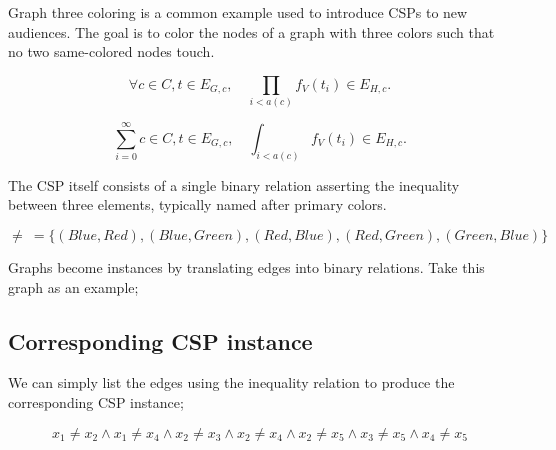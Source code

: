 Graph three coloring is a common example used to introduce CSPs to new
audiences. The goal is to color the nodes of a graph with three colors such that
no two same-colored nodes touch. 

\begin{equation}
    \forall c \in C, t \in E_{G, c}, \quad \prod_{i<a(c)} f_V(t_i) \in E_{H, c}.    
\end{equation}


\begin{equation}
    \sum_{i=0}^\infty c \in C, t \in E_{G, c}, \quad \int_{i<a(c)} f_V(t_i) \in E_{H, c}.    
\end{equation}

The CSP itself consists of a single binary relation asserting the inequality
between three elements, typically named after primary colors.

\begin{equation}\label{equation:three-color-neq-def}
  \neq\ = \{ (\mathit{Blue}, \mathit{Red}), (\mathit{Blue}, \mathit{Green}), (\mathit{Red}, \mathit{Blue}), (\mathit{Red}, \mathit{Green}), (\mathit{Green}, \mathit{Blue}) \}
\end{equation}

Graphs become instances by translating edges into binary relations. Take this
graph as an example;

\begin{center}
\end{center}

\subsection{Corresponding CSP instance}

We can simply list the edges using the inequality relation to produce the
corresponding CSP instance;

\begin{equation}
    x_1 \neq x_2 \wedge x_1 \neq x_4 \wedge x_2 \neq x_3 \wedge x_2 \neq x_4 \wedge x_2 \neq x_5 \wedge x_3 \neq x_5 \wedge x_4 \neq x_5
\end{equation}


